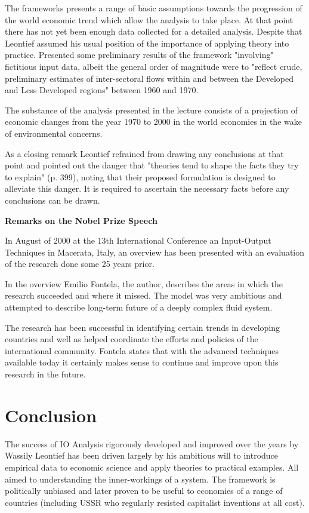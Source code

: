 \documentclass[12pt,a4paper]{scrartcl}
\begin{document}
	The frameworks presents a range of basic assumptions towards the progression of the world economic trend which allow the analysis to take place. At that point there has not yet been enough data collected for a detailed analysis. Despite that Leontief assumed his usual position of the importance of applying theory into practice. Presented some preliminary results of the framework "involving" fictitious input data, albeit the general order of magnitude were to "reflect crude, preliminary estimates of inter-sectoral flows within and between the Developed and Less Developed regions" \cite[p. 389]{leontief1974} between 1960 and 1970.
	
	The substance of the analysis presented in the lecture consists of a projection of economic changes from the year 1970 to 2000 in the world economies in the wake of environmental concerns. 
	
	As a closing remark Leontief refrained from drawing any conclusions at that point and pointed out the danger that "theories tend to shape the facts they try to explain" (p. 399), noting that their proposed formulation is designed to alleviate this danger. It is required to ascertain the necessary facts before any conclusions can be drawn. \cite[pp. 387-401]{leontief1974} \cite[pp. 75-77]{dymond2015recent}
	
	\textbf{Remarks on the Nobel Prize Speech}
	
	In August of 2000 at the 13th International Conference an Input-Output Techniques in Macerata, Italy, an overview has been presented with an evaluation of the research done some 25 years prior.
	
	In the overview Emilio Fontela, the author, describes the areas in which the research succeeded and where it missed. The model was very ambitious and attempted to describe long-term future of a deeply complex fluid system.
	
	The research has been successful in identifying certain trends in developing countries and well as helped coordinate the efforts and policies of the international community. Fontela states that with the advanced techniques available today it certainly makes sense to continue and improve upon this research in the future.

	\section{Conclusion}
	
	The success of IO Analysis rigorously developed and improved over the years by Wassily Leontief has been driven largely by his ambitious will to introduce empirical data to economic science and apply theories to practical examples. All aimed to understanding the inner-workings of a system. The framework is politically unbiased and later proven to be useful to economies of a range of countries (including USSR who regularly resisted capitalist inventions at all cost).
	
\end{document}
